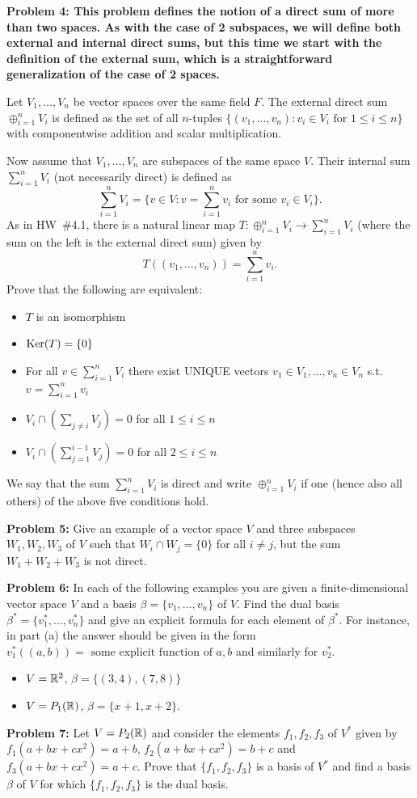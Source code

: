 \documentclass[11pt]{amsart}
\begin{document}
\skv
\bf{Problem 4: }\rm This problem defines the notion of a direct sum
of more than two spaces. As with the case of 2 subspaces, we will define both external and internal direct sums, but this
time we start with the definition of the external sum, which is a straightforward generalization of the case of 2 spaces.

Let $V_1,\ldots, V_n$ be vector spaces over the same field $F$.
The external direct sum $\oplus_{i=1}^n V_i$ is defined as the set of all $n$-tuples
$\{(v_1,\ldots, v_n): v_i\in V_i\mbox{ for }1\leq i\leq n\}$ with componentwise
addition and scalar multiplication.

Now assume that $V_1,\ldots, V_n$ are subspaces of the same space $V$. Their
internal sum  $\sum_{i=1}^n V_i$ (not necessarily direct) is defined as 
$$\sum_{i=1}^n V_i=\{v\in V: v=\sum_{i=1}^n v_i \mbox{ for some }v_i\in V_i\}.$$
As in HW~\#4.1, there is a natural linear map $T:\oplus_{i=1}^n V_i\to \sum_{i=1}^n V_i$
(where the sum on the left is the external direct sum) given by
$$T((v_1,\ldots, v_n))=\sum_{i=1}^n v_i.$$
Prove that the following are equivalent:
\begin{itemize}
\item[(a)] $T$ is an isomorphism
\item[(b)] ${\rm Ker}(T)=\{0\}$
\item[(c)] For all $v\in \sum_{i=1}^n V_i$ there exist UNIQUE vectors
$v_1\in V_1,\ldots, v_n\in V_n$ s.t. $v=\sum_{i=1}^n v_i$
\item[(d)] $V_i\cap (\sum_{j\neq i}V_j)=0$ for all $1\leq i\leq n$ 
\item[(e)] $V_i\cap (\sum_{j=1}^{i-1} V_j)=0$ for all $2\leq i\leq n$ 
\end{itemize}
We say that the sum $\sum_{i=1}^n V_i$ is direct and write $\oplus_{i=1}^n V_i$
if one (hence also all others) of the above five conditions hold.
\skv

{\bf Problem 5:} Give an example of a vector space $V$ and three subspaces $W_1,W_2,W_3$ of $V$ such that $W_i\cap W_j=\{0\}$
for all $i\neq j$, but the sum $W_1+W_2+W_3$ is not direct.
\skv


{\bf Problem 6:} In each of the following examples you are given a finite-dimensional vector space
$V$ and a basis $\beta=\{v_1,\ldots,v_n\}$ of $V$. Find the dual basis $\beta^*=\{v_1^*,\ldots,v_n^*\}$
and give an explicit formula for each element of $\beta^*$. For instance,
in part (a) the answer should be given in the form $v_1^* ((a,b)) = \mbox{ some 
explicit function of }a,b$ and similarly for $v_2^*$.
 \begin{itemize}
\item[(a)] $V={\mathbb R}^2$, $\beta=\{(3,4), (7,8)\}$ 
\item[(b)] $V=P_1({\mathbb R})$, $\beta=\{x+1, x+2\}$.
\end{itemize}


\skv
{\bf Problem 7:} Let $V=P_2({\mathbb R})$ and consider the elements $f_1, f_2, f_3$ of $V^*$
given by $f_1(a+bx+cx^2)=a+b$, $f_2(a+bx+cx^2)=b+c$ and $f_3(a+bx+cx^2)=a+c$. Prove that
$\{f_1, f_2, f_3\}$ is a basis of $V^*$ and find a basis $\beta$ of $V$ for which
$\{f_1, f_2, f_3\}$ is the dual basis.
\end{document}
